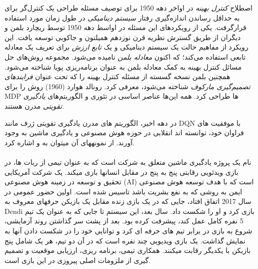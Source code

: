 اصطلاح
\textit{کنترل بهینه}
در اواخر دهه 1950 برای توصیف مسئله طراحی یک کنترل‌گر برای به حداقل رساندن اندازه‌گیری رفتار \textit{سیستم دینامیکی} در طول زمان مورد استفاده قرارگرفت. یکی از رویکردهای این مسئله در اواسط دهه 1950 توسط ریچارد بلمن و دیگران از طریق گسترش نظریه قرن نوزدهم همیلتون و جاکوبی توسعه یافت. این رویکرد از مفاهیم حالت یک سیستم دینامیکی و یک \textit{تابع ارزش} برای تعریف یک معادله تابعی استفاده می‌کند؛ که اکنون \textit{معادله بلمن} نامیده می‌شود. مجموعه روش‌های حل مسائل کنترل بهینه به کمک معادله بلمن به عنوان برنامه‌ریزی پویا شناخته می‌شود. همچنین بلمن نسخه گسسته از مسئله کنترل بهینه را که تحت عنوان \textit{فرایندهای تصمیم‌گیری مارکوف} 
شناخته می‌شود، معرفی کرد. رونالد هوارد (1960) روش
را برای MDP‌ ها طراحی کرد. همه این‌ها عناصر اساسی در تئوری و الگوریتم‌های \textit{یادگیری تقویتی} مدرن هستند.

در دهه اخیر، الگوریتم های مدرن یادگیری تقویتی  ژرف مانند DQN با موفقیت های فراوان خود، توانسته اند انقلابی در حوزه هوش مصنوعی و یادگیری ماشین به وجود آورند. از نمونه\nf های آن می\nf توان به
 و
   اشاره کرد.
  
  \paragraph{}
    
   نام یک پروژه یادگیری ماشین متعلق به شرکت 
   است که به عنوان تیمی از ربات ها،  در بازی ویدئویی رقابتی پنج به پنج 
     در مقابل انسان\nf ها بازی می\nf کند.
 یک شرکت آمریکایی تحقیق و توسعه در زمینه هوش مصنوعی (AI) است که با هدف توسعه هوش مصنوعی ایمن به روشی که به نفع بشریت باشد تاسیس شده است. اولین حضور عمومی
  در سال 2017 اتفاق افتاد، جایی که در یک بازی زنده مقابل یک بازیکن حرفه\nf ای معروف به Dendi بازی کرد و او را شکست داد. سال بعد، این سیستم تا جایی که به عنوان یک تیم 5 نفره کامل عمل کند، پیشرفت کرده بود. بعد از پشت سر گذاشتن روند آزمایشی، شروع به بازی در برابر تیم های حرفه ای کرد و توانایی خود را در شکست دادن آن\nf ها به نمایش گذاشت. 
  یک بازی ویدیویی چند نفره است که در آن دو تیم، هر یک شامل پنج بازیکن با یکدیگر رقابت می\nf کنند. همکاری تیمی، برنامه ریزی، ارزیابی موقعیت و تصمیم گیری از ملزومات اصلی پیروزی در این بازی است.
   
